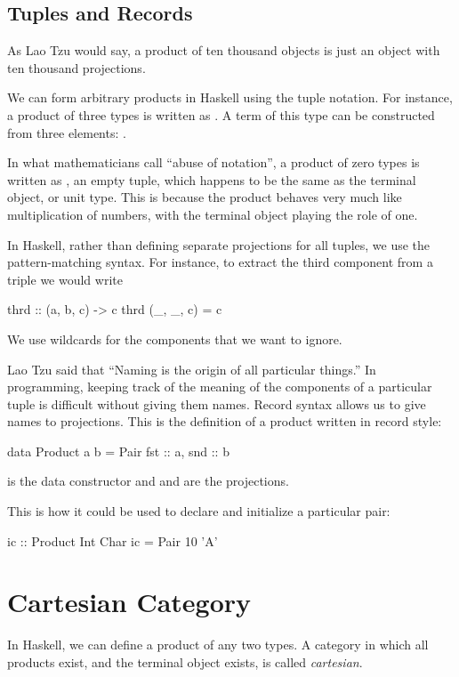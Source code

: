 \documentclass[DaoFP]{subfiles}
\begin{document}
\subsection{Tuples and Records}

As Lao Tzu would say, a product of ten thousand objects is just an object with ten thousand projections. 

We can form arbitrary products in Haskell using the tuple notation. For instance, a product of three types is written as . A term of this type can be constructed from three elements: . 

In what mathematicians call ``abuse of notation'', a product of zero types is written as \hask{()}, an empty tuple, which happens to be the same as the terminal object, or unit type. This is because the product behaves very much like multiplication of numbers, with the terminal object playing the role of one.

In Haskell, rather than defining separate projections for all tuples, we use the pattern-matching syntax. For instance, to extract the third component from a triple we would write

\begin{haskell}
thrd :: (a, b, c) -> c
thrd (_, _, c) = c
\end{haskell}
We use wildcards for the components that we want to ignore.

Lao Tzu said that ``Naming is the origin of all particular things.'' In programming, keeping track of the meaning of the components of a particular tuple is difficult without giving them names. Record syntax allows us to give names to projections. This is the definition of a product written in record style:
\begin{haskell}
data Product a b = Pair { fst :: a, snd :: b }
\end{haskell}
 is the data constructor and  and  are the projections. 

This is how it could be used to declare and initialize a particular pair:
\begin{haskell}
ic :: Product Int Char
ic = Pair 10 'A'
\end{haskell}

\section{Cartesian Category}

In Haskell, we can define a product of any two types. A category in which all products exist, and the terminal object exists, is called \emph{cartesian}. 
\end{document}
